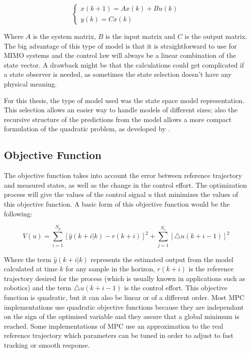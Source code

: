 \begin{itemize}
\begin{equation} \label{statespacemodel1}
\begin{cases} x(k + 1) = Ax(k) + Bu(k) \\ y(k) = Cx(k)
\end{cases}
\end{equation}

Where $A$ is the system matrix, $B$ is the input matrix and $C$ is the output matrix. The big advantage of this type of model is that it is straightforward to use for MIMO systems and the control law will always be a linear combination of the state vector. A drawback might be that the calculations could get complicated if a state observer is needed, as sometimes the state selection doesn't have any physical meaning.

\end{itemize}

For this thesis, the type of model used was the state space model representation. This selection allows an easier way to handle models of different sizes; also the recursive structure of the predictions from the model allows a more compact formulation of the quadratic problem, as developed by \cite{Ferreau2006}.


 
\subsection{Objective Function}%

The objective function takes into account the error between reference trajectory and measured states, as well as the change in the control effort. The optimization process will give the values of the control signal $u$ that minimizes the values of this objective function. A basic form of this objective function would be the following:

\begin{equation} \label{objectivefunction1}
V(u) = \sum_{i=1}^{N_{p}}  [\hat{y}(k + i | k) - r(k + i)]^2 + \sum_{j=1}^{N_{c}} [\triangle u(k + i - 1)]^2
\end{equation}

Where the term $\hat{y}(k + i | k)$ represents the estimated output from the model calculated at time $k$ for any sample in the horizon, $r(k + i)$ is the reference trajectory desired for the process (which is usually known in applications such as robotics) and the term $\triangle u(k + i - 1)$ is the control effort. This objective function is quadratic, but it can also be linear or of a different order. Most MPC implementations use quadratic objective functions because they are independant on the sign of the optimised variable and they assure that a global minimum is reached. Some implementations of MPC use an approximation to the real reference trajectory which parameters can be tuned in order to adjust to fast tracking or smooth response.\\ 

